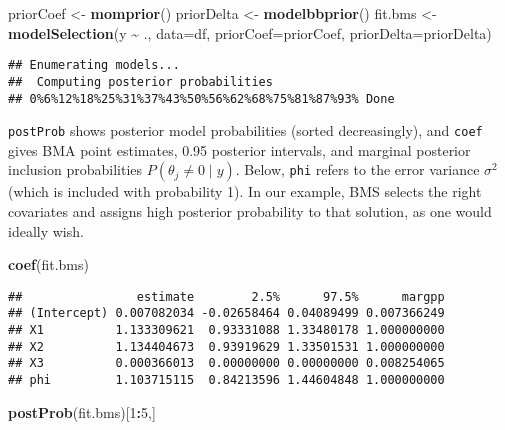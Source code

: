\documentclass[
]{book}
\newenvironment{Shaded}{\begin{snugshade}}{\end{snugshade}}
\newcommand{\AttributeTok}[1]{\textcolor[rgb]{0.13,0.29,0.53}{#1}}
\newcommand{\DecValTok}[1]{\textcolor[rgb]{0.00,0.00,0.81}{#1}}
\newcommand{\FunctionTok}[1]{\textcolor[rgb]{0.13,0.29,0.53}{\textbf{#1}}}
\newcommand{\NormalTok}[1]{#1}
\newcommand{\OtherTok}[1]{\textcolor[rgb]{0.56,0.35,0.01}{#1}}
\newcommand{\SpecialCharTok}[1]{\textcolor[rgb]{0.81,0.36,0.00}{\textbf{#1}}}
\theoremstyle{definition}
\theoremstyle{definition}
\theoremstyle{definition}
\theoremstyle{definition}
\theoremstyle{remark}
\begin{document}
\begin{Shaded}
\begin{Highlighting}[]
\NormalTok{priorCoef }\OtherTok{\textless{}{-}} \FunctionTok{momprior}\NormalTok{()}
\NormalTok{priorDelta }\OtherTok{\textless{}{-}} \FunctionTok{modelbbprior}\NormalTok{()}
\NormalTok{fit.bms }\OtherTok{\textless{}{-}} \FunctionTok{modelSelection}\NormalTok{(y }\SpecialCharTok{\textasciitilde{}}\NormalTok{ ., }\AttributeTok{data=}\NormalTok{df,}
                     \AttributeTok{priorCoef=}\NormalTok{priorCoef, }
                     \AttributeTok{priorDelta=}\NormalTok{priorDelta)}
\end{Highlighting}
\end{Shaded}

\begin{verbatim}
## Enumerating models...
##  Computing posterior probabilities
## 0%6%12%18%25%31%37%43%50%56%62%68%75%81%87%93% Done
\end{verbatim}

\texttt{postProb} shows posterior model probabilities (sorted decreasingly), and \texttt{coef} gives BMA point estimates, 0.95 posterior intervals, and marginal posterior inclusion probabilities \(P(\theta_j \neq 0 \mid y)\).
Below, \texttt{phi} refers to the error variance \(\sigma^2\) (which is included with probability 1).
In our example, BMS selects the right covariates and assigns high posterior probability to that solution, as one would ideally wish.

\begin{Shaded}
\begin{Highlighting}[]
\FunctionTok{coef}\NormalTok{(fit.bms)}
\end{Highlighting}
\end{Shaded}

\begin{verbatim}
##                estimate        2.5%      97.5%      margpp
## (Intercept) 0.007082034 -0.02658464 0.04089499 0.007366249
## X1          1.133309621  0.93331088 1.33480178 1.000000000
## X2          1.134404673  0.93919629 1.33501531 1.000000000
## X3          0.000366013  0.00000000 0.00000000 0.008254065
## phi         1.103715115  0.84213596 1.44604848 1.000000000
\end{verbatim}

\begin{Shaded}
\begin{Highlighting}[]
\FunctionTok{postProb}\NormalTok{(fit.bms)[}\DecValTok{1}\SpecialCharTok{:}\DecValTok{5}\NormalTok{,]}
\end{Highlighting}
\end{Shaded}
\end{document}
